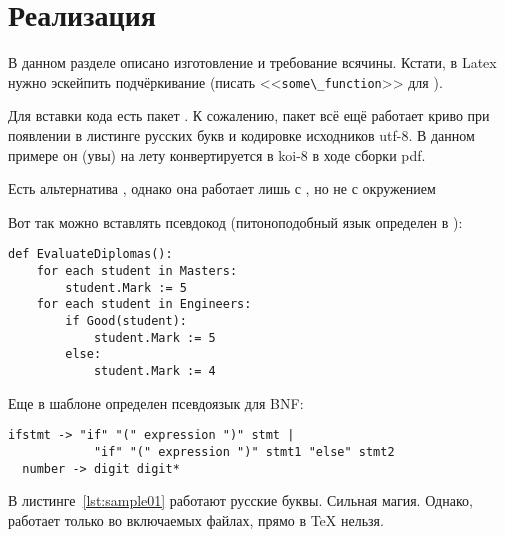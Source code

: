 \chapter{Реализация}
\label{cha:impl}

В данном разделе описано изготовление и требование всячины. Кстати,
в Latex нужно эскейпить подчёркивание (писать <<\verb|some\_function|>> для ).

\ifPDFTeX
Для вставки кода есть пакет . К сожалению, пакет  всё ещё
работает криво при появлении в листинге русских букв и кодировке исходников utf-8.
В данном примере он (увы) на лету конвертируется в koi-8 в ходе сборки pdf.

Есть альтернатива , однако она работает лишь с
, но не с окружением 

Вот так можно вставлять псевдокод (питоноподобный язык определен в ):

\begin{lstlisting}[style=pseudocode,caption={Алгоритм оценки дипломных работ}]
def EvaluateDiplomas():
    for each student in Masters:
        student.Mark := 5
    for each student in Engineers:
        if Good(student):
            student.Mark := 5
        else:
            student.Mark := 4
\end{lstlisting}

Еще в шаблоне определен псевдоязык для BNF:

\begin{lstlisting}[style=grammar,basicstyle=\small,caption={Грамматика}]
  ifstmt -> "if" "(" expression ")" stmt |
            "if" "(" expression ")" stmt1 "else" stmt2
  number -> digit digit*
\end{lstlisting}

В листинге~\ref{lst:sample01} работают русские буквы. Сильная магия. Однако, работает
только во включаемых файлах, прямо в \TeX{} нельзя.




